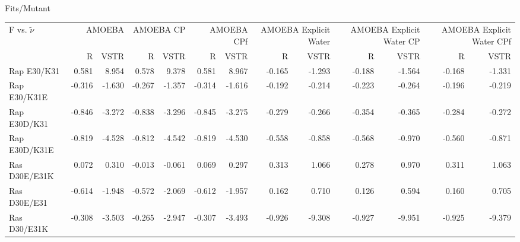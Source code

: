 \documentclass[landscape]{article}
\begin{document}
	
	
	
Fits/Mutant \\
{
\begin{tabular}{ l || r r | r r | r r | r r| r r | r r}
F vs. $\tilde \nu$ & \multicolumn{2}{|C{2cm}}{AMOEBA} & \multicolumn{2}{|C{2cm}}{AMOEBA CP} & \multicolumn{2}{|C{2cm}}{AMOEBA CPf} & \multicolumn{2}{|C{2cm}}{AMOEBA Explicit Water} & \multicolumn{2}{|C{2cm}}{AMOEBA Explicit Water CP} & \multicolumn{2}{|C{2cm}}{AMOEBA Explicit Water CPf} \\
 & \multicolumn{1}{|C{1cm}}{R} & \multicolumn{1}{C{1cm}}{VSTR} & \multicolumn{1}{|C{1cm}}{R} & \multicolumn{1}{C{1cm}}{VSTR} & \multicolumn{1}{|C{1cm}}{R} & \multicolumn{1}{C{1cm}}{VSTR}  & \multicolumn{1}{|C{1cm}}{R} & \multicolumn{1}{C{1cm}}{VSTR} & \multicolumn{1}{|C{1cm}}{R} & \multicolumn{1}{C{1cm}}{VSTR} & \multicolumn{1}{|C{1cm}}{R} & \multicolumn{1}{C{1cm}}{VSTR} \\
\hline\hline	
Rap E30/K31    & 0.581          & 8.954          & 0.578          & 9.378          & 0.581          & 8.967          & -0.165         & -1.293         & -0.188         & -1.564         & -0.168         & -1.331        \\
Rap E30/K31E   & -0.316         & -1.630         & -0.267         & -1.357         & -0.314         & -1.616         & -0.192         & -0.214         & -0.223         & -0.264         & -0.196         & -0.219        \\
Rap E30D/K31   & -0.846         & -3.272         & -0.838         & -3.296         & -0.845         & -3.275         & -0.279         & -0.266         & -0.354         & -0.365         & -0.284         & -0.272        \\
Rap E30D/K31E  & -0.819         & -4.528         & -0.812         & -4.542         & -0.819         & -4.530         & -0.558         & -0.858         & -0.568         & -0.970         & -0.560         & -0.871        \\
Ras D30E/E31K  & 0.072          & 0.310          & -0.013         & -0.061         & 0.069          & 0.297          & 0.313          & 1.066          & 0.278          & 0.970          & 0.311          & 1.063         \\
Ras D30E/E31   & -0.614         & -1.948         & -0.572         & -2.069         & -0.612         & -1.957         & 0.162          & 0.710          & 0.126          & 0.594          & 0.160          & 0.705         \\
Ras D30/E31K   & -0.308         & -3.503         & -0.265         & -2.947         & -0.307         & -3.493         & -0.926         & -9.308         & -0.927         & -9.951         & -0.925         & -9.379        \\

\end{tabular}}
\end{document}
